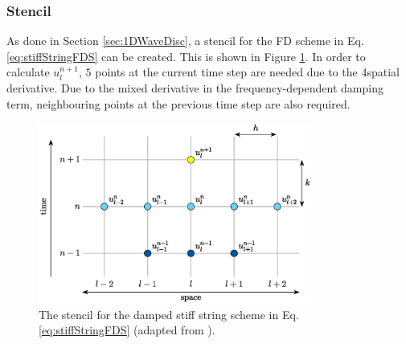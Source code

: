 \subsubsection{Stencil}
As done in Section \ref{sec:1DWaveDisc}, a stencil for the FD scheme in Eq. 
\eqref{eq:stiffStringFDS} can be created. This is shown in Figure \ref{fig:stencilStiffString}. In order to calculate $u_l^{n+1}$, $5$ points at the current time step are needed due to the 4\thOrder spatial derivative. Due to the mixed derivative in the frequency-dependent damping term, neighbouring points at the previous time step are also required. 

\begin{figure}[h]
    \centering
    \includegraphics[width=0.8\textwidth]{figures/resonators/stencilDampedStiffString.eps}
    \caption{The stencil for the damped stiff string scheme in Eq. \eqref{eq:stiffStringFDS} (adapted from \citeP[A]).\label{fig:stencilStiffString}}
\end{figure}

